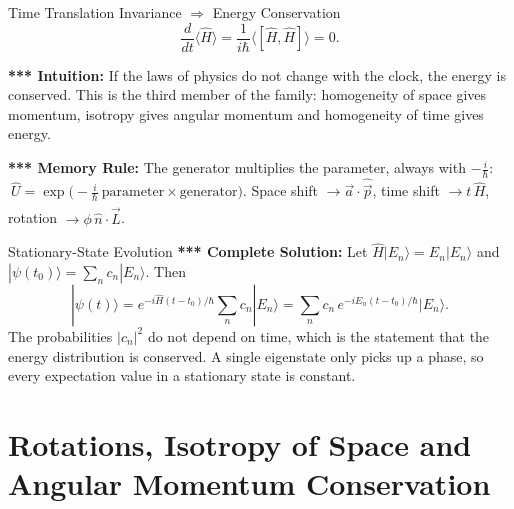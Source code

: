 \documentclass[11pt,a4paper]{article}
\begin{document}
\begin{thm}{Time Translation Invariance $\Rightarrow$ Energy Conservation}
\[
\frac{d}{dt}\langle\hat H\rangle=\frac1{i\hbar}\langle[\hat H,\hat H]\rangle=0 .
\]
\end{thm}

\textbf{*** Intuition:} If the laws of physics do not change with the clock, the energy is conserved. This is the third member of the family: homogeneity of space gives momentum, isotropy gives angular momentum and homogeneity of time gives energy.

\textbf{*** Memory Rule:} The generator multiplies the parameter, always with $-\tfrac i\hbar$: $\ \hat U=\exp\!\big(-\tfrac i\hbar\ \mathrm{parameter}\times\mathrm{generator}\big)$. Space shift $\to\vec a\cdot\hat{\vec p}$, time shift $\to t\,\hat H$, rotation $\to\phi\,\hat n\cdot\hat{\vec L}$.

\begin{prob}{Stationary-State Evolution}
\textbf{*** Complete Solution:} Let $\hat H|E_n\rangle=E_n|E_n\rangle$ and $|\psi(t_0)\rangle=\sum_nc_n|E_n\rangle$. Then
\[
|\psi(t)\rangle=e^{-i\hat H(t-t_0)/\hbar}\sum_nc_n|E_n\rangle=\sum_nc_n\,e^{-iE_n(t-t_0)/\hbar}|E_n\rangle .
\]
The probabilities $|c_n|^2$ do not depend on time, which is the statement that the energy distribution is conserved. A single eigenstate only picks up a phase, so every expectation value in a stationary state is constant.
\end{prob}

\section{Rotations, Isotropy of Space and Angular Momentum Conservation}
\label{sy:sec:rot}
\end{document}
